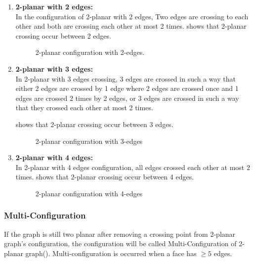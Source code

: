 \begin{enumerate}

\item {\textbf{2-planar with 2 edges:\\}}
In the configuration of 2-planar with 2 edges, Two edges are crossing to each other and both are crossing each other at most 2 times.
 shows that 2-planar crossing occur between 2 edges.



\begin{figure}[!tb]
\centering
\resizebox{150mm}{!}{}
\caption{2-planar configuration with 2-edges.}
\label{fig:2planarwith2edges}
\end{figure}


\item {\textbf{2-planar with 3 edges:\\}}
In 2-planar with 3 edges crossing, 3 edges are crossed in such a way that either 2 edges are crossed by 1 edge where 2 edges are crossed once and 1 edges are crossed 2 times by 2 edges, or 3 edges are crossed in such a way that they crossed each other at most 2 times.

 shows that 2-planar crossing occur between 3 edges.

\begin{figure}[!tb]
\centering
\resizebox{100mm}{!}{}
\caption{2-planar configuration with 3-edges}
\label{fig:2planarwith3edges}
\end{figure}


\item {\textbf{2-planar with 4 edges:\\}}
In 2-planar with 4 edges configuration, all edges crossed each other at most 2 times.
 shows that 2-planar crossing occur between 4 edges.
\begin{figure}[!tb]
\centering
\resizebox{60mm}{!}{}
\caption{2-planar configuration with 4-edges}
\label{fig:2planarwith4edges}
\end{figure}
\end{enumerate}

\subsubsection{Multi-Configuration}
If the graph is still two planar after removing a crossing point from 2-planar graph's configuration, the configuration will be called Multi-Configuration of 2-planar graph(). Multi-configuration is occurred when a face has $\geq 5$ edges.

